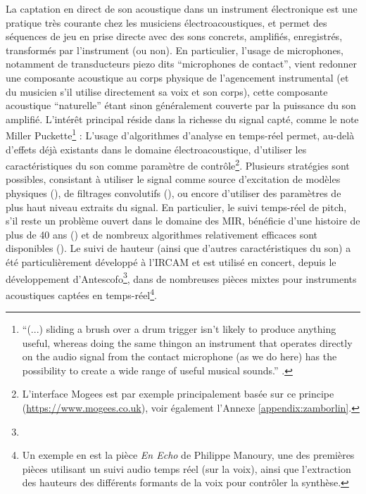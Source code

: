 \noindent La captation en direct de son acoustique dans un instrument électronique est une pratique très courante chez les musiciens électroacoustiques, et permet des séquences de jeu en prise directe avec des sons concrets, amplifiés, enregistrés, transformés par l'instrument (ou non). En particulier, l'usage de microphones, notamment de transducteurs piezo dits ``microphones de contact'', vient redonner une composante acoustique au corps physique de l'agencement instrumental (et du musicien s'il utilise directement sa voix et son corps), cette composante acoustique ``naturelle'' étant sinon généralement couverte par la puissance du son amplifié. L'intérêt principal réside dans la richesse du signal capté, comme le note Miller Puckette\footnote{``(...) sliding a brush over a drum trigger isn’t likely to produce  anything  useful,  whereas  doing  the  same  thingon an instrument that operates directly on the audio signal from the contact microphone (as we do here) has the possibility to create a wide range of useful musical sounds.'' \cite{puckette_infuriating_2011}.} :  L'usage d'algorithmes d'analyse en temps-réel permet, au-delà d'effets déjà existants dans le domaine électroacoustique, d'utiliser les caractéristiques du son comme paramètre de contrôle\footnote{L'interface Mogees est par exemple principalement basée sur ce principe (\url{https://www.mogees.co.uk}), voir également l'Annexe \ref{appendix:zamborlin}.}. Plusieurs stratégies sont possibles, consistant à utiliser le signal comme source d'excitation de modèles physiques (\cite{momeni_composing_2005, schlessinger_kalichord_2009, mehes_virtual-acoustic_2017, williams_pitch_2017, robertson_harmonic_2018}), de filtrages convolutifs (\cite{schwarz_rich_2014}), ou encore d'utiliser des paramètres de plus haut niveau extraits du signal. En particulier, le suivi temps-réel de pitch, s'il reste un problème ouvert dans le domaine des \gls{MIR}, bénéficie d'une histoire de plus de 40 ans (\cite{noll_cepstrum_1967}) et de nombreux algorithmes relativement efficaces sont disponibles (\cite{boersma_accurate_1993, de_cheveigne_yin_2002,pardue_low-cost_2015, schramm_polyphonic_2018}). Le suivi de hauteur (ainsi que d'autres caractéristiques du son) a été particulièrement développé à l'\gls{IRCAM} et est utilisé en concert, depuis le développement d'Antescofo\footnote{}, dans de nombreuses pièces mixtes pour instruments acoustiques captées en temps-réel\footnote{Un exemple en est la pièce \textit{En Echo} de Philippe Manoury, une des premières pièces utilisant un suivi audio temps réel (sur la voix), ainsi que l'extraction des hauteurs des différents formants de la voix pour contrôler la synthèse.}.


